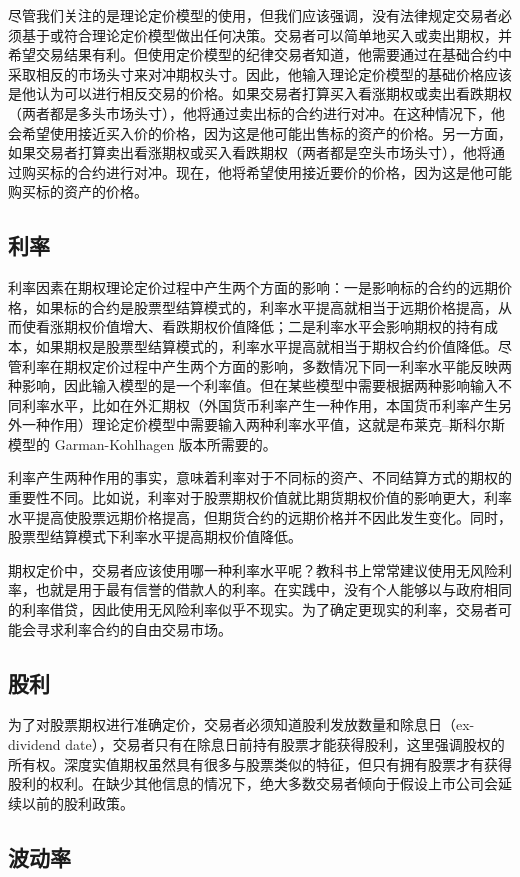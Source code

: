 尽管我们关注的是理论定价模型的使用，但我们应该强调，没有法律规定交易者必须基于或符合理论定价模型做出任何决策。交易者可以简单地买入或卖出期权，并希望交易结果有利。但使用定价模型的纪律交易者知道，他需要通过在基础合约中采取相反的市场头寸来对冲期权头寸。因此，他输入理论定价模型的基础价格应该是他认为可以进行相反交易的价格。如果交易者打算买入看涨期权或卖出看跌期权（两者都是多头市场头寸），他将通过卖出标的合约进行对冲。在这种情况下，他会希望使用接近买入价的价格，因为这是他可能出售标的资产的价格。另一方面，如果交易者打算卖出看涨期权或买入看跌期权（两者都是空头市场头寸），他将通过购买标的合约进行对冲。现在，他将希望使用接近要价的价格，因为这是他可能购买标的资产的价格。
\subsection{利率}
利率因素在期权理论定价过程中产生两个方面的影响：一是影响标的合约的远期价格，如果标的合约是股票型结算模式的，利率水平提高就相当于远期价格提高，从而使看涨期权价值增大、看跌期权价值降低；二是利率水平会影响期权的持有成本，如果期权是股票型结算模式的，利率水平提高就相当于期权合约价值降低。尽管利率在期权定价过程中产生两个方面的影响，多数情况下同一利率水平能反映两种影响，因此输入模型的是一个利率值。但在某些模型中需要根据两种影响输入不同利率水平，比如在外汇期权（外国货币利率产生一种作用，本国货币利率产生另外一种作用）理论定价模型中需要输入两种利率水平值，这就是布莱克–斯科尔斯模型的 Garman-Kohlhagen 版本所需要的。

利率产生两种作用的事实，意味着利率对于不同标的资产、不同结算方式的期权的重要性不同。比如说，利率对于股票期权价值就比期货期权价值的影响更大，利率水平提高使股票远期价格提高，但期货合约的远期价格并不因此发生变化。同时，股票型结算模式下利率水平提高期权价值降低。

期权定价中，交易者应该使用哪一种利率水平呢？教科书上常常建议使用无风险利率，也就是用于最有信誉的借款人的利率。在实践中，没有个人能够以与政府相同的利率借贷，因此使用无风险利率似乎不现实。为了确定更现实的利率，交易者可能会寻求利率合约的自由交易市场。
\subsection{股利}
为了对股票期权进行准确定价，交易者必须知道股利发放数量和除息日（ex-dividend date），交易者只有在除息日前持有股票才能获得股利，这里强调股权的所有权。深度实值期权虽然具有很多与股票类似的特征，但只有拥有股票才有获得股利的权利。在缺少其他信息的情况下，绝大多数交易者倾向于假设上市公司会延续以前的股利政策。
\subsection{波动率}
